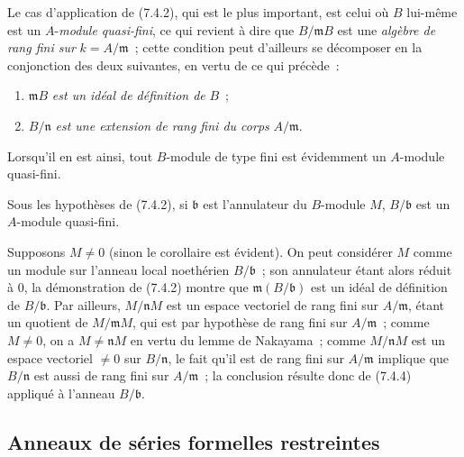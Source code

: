 \begin{env}[7.4.4]
\label{0.7.4.4-fr}
Le cas d'application de (7.4.2), qui est le plus important, est celui où $B$
lui-même est un $A$-\emph{module quasi-fini}, ce qui revient à dire que
$B/\mathfrak mB$ est une \emph{algèbre de rang fini sur}
$k=A/\mathfrak m$~; cette condition peut d'ailleurs se décomposer en la
conjonction des deux suivantes, en vertu de ce qui précède~:
\begin{enumerate}
  \item[(i)] $\mathfrak mB$ \emph{est un idéal de définition de} $B$~;
  \item[(ii)] $B/\mathfrak n$ \emph{est une extension de rang fini du corps}
  $A/\mathfrak m$.
\end{enumerate}
Lorsqu'il en est ainsi, tout $B$-module de type fini est évidemment un
$A$-module quasi-fini.
\end{env}

\begin{corollary}[7.4.5]
\label{0.7.4.5-fr}
Sous les hypothèses de (7.4.2), si $\mathfrak b$ est l'annulateur du
$B$-module $M$, $B/\mathfrak b$ est un $A$-module quasi-fini.
\end{corollary}

Supposons $M\neq0$ (sinon le corollaire est évident). On peut considérer $M$
comme un module sur l'anneau local noethérien $B/\mathfrak b$~; son annulateur
étant alors réduit à $0$, la démonstration de (7.4.2) montre que
$\mathfrak m(B/\mathfrak b)$ est un idéal de définition de
$B/\mathfrak b$. Par ailleurs, $M/\mathfrak nM$ est un espace vectoriel de
rang fini sur $A/\mathfrak m$, étant un quotient de $M/\mathfrak mM$, qui est
par hypothèse de rang fini sur $A/\mathfrak m$~; comme $M\neq0$, on a
$M\neq\mathfrak nM$ en vertu du lemme de Nakayama~; comme
$M/\mathfrak nM$ est un espace vectoriel $\neq0$ sur $B/\mathfrak n$, le fait
qu'il est de rang fini sur $A/\mathfrak m$ implique que $B/\mathfrak n$ est
aussi de rang fini sur $A/\mathfrak m$~; la conclusion résulte donc de (7.4.4)
appliqué à l'anneau $B/\mathfrak b$.

\subsection{Anneaux de séries formelles restreintes}
\label{subsection:0.7.5-fr}

